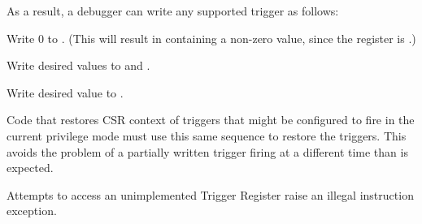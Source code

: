 \begin{steps}{As a result, a debugger can write any supported trigger as
follows:}
\item Write 0 to \RcsrTdataOne. (This will result in \RcsrTdataOne containing a
    non-zero value, since the register is \warl.)
\item Write desired values to \RcsrTdataTwo and \RcsrTdataThree.
\item Write desired value to \RcsrTdataOne.
\end{steps}

Code that restores CSR context of triggers that might be configured to fire in
the current privilege mode must use this same sequence to restore the triggers.
This avoids the problem of a partially written trigger firing at a different
time than is expected.

Attempts to access an unimplemented Trigger Register raise an illegal instruction
exception.



